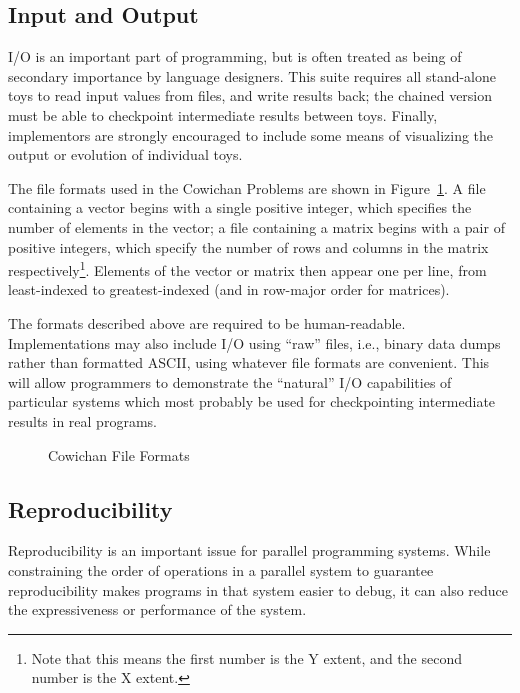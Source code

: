 \subsection{Input and Output\label{s:issues-io}}

I/O is an important part of programming,
but is often treated as being of secondary importance by language designers.
This suite requires all stand-alone toys to read input values from files, and write results back;
the chained version must be able to checkpoint intermediate results between toys.
Finally,
implementors are strongly encouraged to include some means of visualizing the output or evolution of individual toys.

The file formats used in the Cowichan Problems are shown in Figure~\ref{f:io-formats}.
A file containing a vector begins with a single positive integer,
which specifies the number of elements in the vector;
a file containing a matrix begins with a pair of positive integers,
which specify the number of rows and columns in the matrix respectively\footnote{Note
that this means the first number is the Y extent, and the second number is the X extent.}.
Elements of the vector or matrix then appear one per line,
from least-indexed to greatest-indexed
(and in row-major order for matrices).

The formats described above are required to be human-readable.
Implementations may also include I/O using ``raw'' files,
i.e., binary data dumps rather than formatted ASCII,
using whatever file formats are convenient.
This will allow programmers to demonstrate the ``natural'' I/O capabilities of particular systems
which most probably be used for checkpointing intermediate results in real programs.

\begin{figure}
\caption{Cowichan File Formats\label{f:io-formats}}
\end{figure}

\subsection{Reproducibility\label{s:issues-reproduce}}

Reproducibility is an important issue for parallel programming systems.
While constraining the order of operations in a parallel system to guarantee reproducibility makes programs in that system easier to debug,
it can also reduce the expressiveness or performance of the system.

